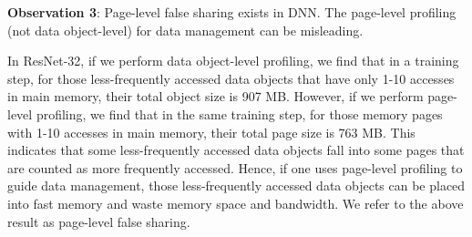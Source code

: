 \textbf{Observation 3}: Page-level false sharing exists in DNN. The page-level profiling (not data object-level) for data management can be misleading. 

\textcolor{check}{In ResNet-32, if we perform data object-level profiling, we find that in a training step, for those less-frequently accessed data objects that have only 1-10 accesses in main memory, their total object size is 907 MB. However, if we perform page-level profiling, we find that in the same training step, for those memory pages with 1-10 accesses in main memory, their total page size is 763 MB.  This indicates that some less-frequently accessed data objects fall into some pages that are counted as more frequently accessed. Hence, if one uses page-level profiling to guide data management, those less-frequently accessed data objects can be placed into fast memory and waste memory space and bandwidth. We refer to the above result as page-level false sharing. }


